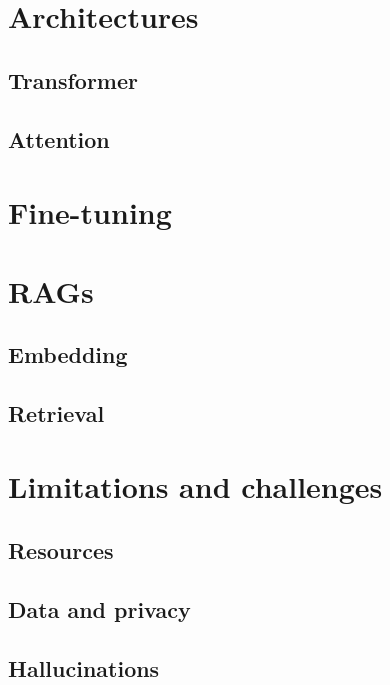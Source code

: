 \documentclass[12pt,a4paper,openright,twoside]{book}
\begin{document}
\section{Architectures}\label{sec:llm-architectures}

\subsection{Transformer}\label{subsec:transformer}

\subsection{Attention}\label{subsec:attention}

\section{Fine-tuning}\label{sec:llm-fine-tuning}

\section{\Acp{RAG}}\label{sec:rag}

\subsection{Embedding}\label{subsec:rag-embedding}

\subsection{Retrieval}\label{subsec:retrieval}

\section{Limitations and challenges}\label{sec:limitations-and-challenges}

\subsection{Resources}\label{subsec:resources}

\subsection{Data and privacy}\label{subsec:data-and-privacy}

\subsection{Hallucinations}\label{subsec:hallucinations}
\end{document}
